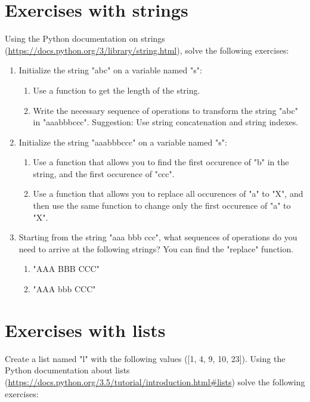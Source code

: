 \section{Exercises with strings}

Using the Python documentation on strings (\url{https://docs.python.org/3/library/string.html}), solve the following exercises:

\begin{enumerate}

\item Initialize the string "abc" on a variable named "s":
\begin{enumerate}
\item Use a function to get the length of the string.
\item Write the necessary sequence of operations to transform the string "abc" in "aaabbbccc". Suggestion: Use string concatenation and string indexes.
\end{enumerate}

\item Initialize the string "aaabbbccc" on a variable named "s":
\begin{enumerate}
\item Use a function that allows you to find the first occurence of "b" in the string, and the first occurence of "ccc".
\item Use a function that allows you to replace all occurences of "a" to "X", and then use the same function to change only the first occurence of "a" to "X".
\end{enumerate}

\item Starting from the string "aaa bbb ccc", what sequences of operations do you need to arrive at the following strings? You can find the "replace" function.
\begin{enumerate}
\item "AAA BBB CCC"
\item "AAA bbb CCC"
\end{enumerate}

\end{enumerate}

\section{Exercises with lists}

Create a list named "l" with the following values ([1, 4, 9, 10, 23]). Using the Python documentation about lists (\url{https://docs.python.org/3.5/tutorial/introduction.html#lists}) solve the following exercises:

